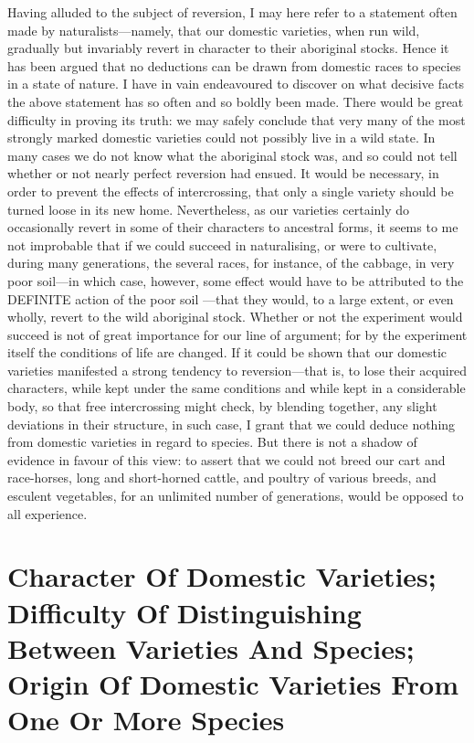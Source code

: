 Having alluded to the subject of reversion, I may here refer to
a statement often made by naturalists—namely, that our domestic
varieties, when run wild, gradually but invariably revert in
character to their aboriginal stocks. Hence it has been argued that
no deductions can be drawn from domestic races to species in a
state of nature. I have in vain endeavoured to discover on what
decisive facts the above statement has so often and so boldly been
made. There would be great difficulty in proving its truth: we may
safely conclude that very many of the most strongly marked domestic
varieties could not possibly live in a wild state. In many cases we
do not know what the aboriginal stock was, and so could not tell
whether or not nearly perfect reversion had ensued. It would be
necessary, in order to prevent the effects of intercrossing, that
only a single variety should be turned loose in its new home.
Nevertheless, as our varieties certainly do occasionally revert in
some of their characters to ancestral forms, it seems to me not
improbable that if we could succeed in naturalising, or were to
cultivate, during many generations, the several races, for
instance, of the cabbage, in very poor soil—in which case, however,
some effect would have to be attributed to the DEFINITE action of
the poor soil —that they would, to a large extent, or even wholly,
revert to the wild aboriginal stock. Whether or not the experiment
would succeed is not of great importance for our line of argument;
for by the experiment itself the conditions of life are changed. If
it could be shown that our domestic varieties manifested a strong
tendency to reversion—that is, to lose their acquired characters,
while kept under the same conditions and while kept in a
considerable body, so that free intercrossing might check, by
blending together, any slight deviations in their structure, in
such case, I grant that we could deduce nothing from domestic
varieties in regard to species. But there is not a shadow of
evidence in favour of this view: to assert that we could not breed
our cart and race-horses, long and short-horned cattle, and poultry
of various breeds, and esculent vegetables, for an unlimited number
of generations, would be opposed to all experience.


\section{Character Of Domestic Varieties; Difficulty Of Distinguishing Between Varieties And Species; Origin Of Domestic Varieties From One Or More Species}

